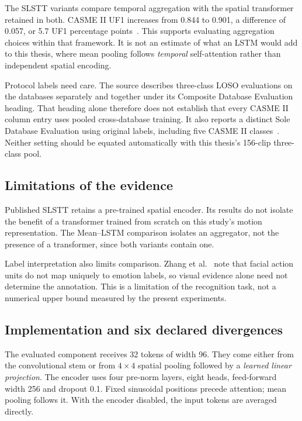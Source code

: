 The SLSTT variants compare temporal aggregation with the spatial transformer retained in both. CASME II UF1 increases from 0.844 to 0.901, a difference of 0.057, or 5.7 UF1 percentage points~\cite{zhang2022}. This supports evaluating aggregation choices within that framework. It is not an estimate of what an LSTM would add to this thesis, where mean pooling follows \emph{temporal} self-attention rather than independent spatial encoding.

Protocol labels need care. The source describes three-class LOSO evaluations on the databases separately and together under its Composite Database Evaluation heading. That heading alone therefore does not establish that every CASME II column entry uses pooled cross-database training. It also reports a distinct Sole Database Evaluation using original labels, including five CASME II classes~\cite{zhang2022}. Neither setting should be equated automatically with this thesis's 156-clip three-class pool.

\subsection{Limitations of the evidence}
\label{sec:transformer-limitations}

Published SLSTT retains a pre-trained spatial encoder. Its results do not isolate the benefit of a transformer trained from scratch on this study's motion representation. The Mean--LSTM comparison isolates an aggregator, not the presence of a transformer, since both variants contain one.

Label interpretation also limits comparison. Zhang et al.~\cite{zhang2022} note that facial action units do not map uniquely to emotion labels, so visual evidence alone need not determine the annotation. This is a limitation of the recognition task, not a numerical upper bound measured by the present experiments.

\subsection{Implementation and six declared divergences}
\label{sec:transformer-implications}

The evaluated component receives 32 tokens of width 96. They come either from the convolutional stem or from $4\times4$ spatial pooling followed by a \emph{learned linear projection}. The encoder uses four pre-norm layers, eight heads, feed-forward width 256 and dropout 0.1. Fixed sinusoidal positions precede attention; mean pooling follows it. With the encoder disabled, the input tokens are averaged directly.

